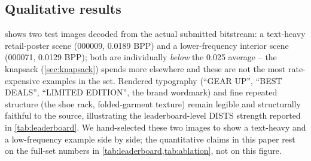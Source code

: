 \documentclass[runningheads]{llncs}
\begin{document}
\begin{table}[t]
\centering\scriptsize
{}
\caption{Official final test-phase leaderboard, organizer-recalculated and announced August 4, 2026, at full precision. Our DISTS (0.038970) is second-lowest overall (only prophet1's 0.038851 is lower) and lowest among every entry ranked above us; our LPIPS is not a leadership position. PSNR trails the top four by 1.6--2.8\,dB (\cref{sec:discussion}).}
\label{tab:leaderboard}
\end{table}

\subsection{Qualitative results}
 shows two test images decoded from the actual submitted bitstream: a text-heavy retail-poster scene (000009, 0.0189 BPP) and a lower-frequency interior scene (000071, 0.0129 BPP); both are individually \emph{below} the 0.025 average -- the knapsack (\cref{sec:knapsack}) spends more elsewhere and these are not the most rate-expensive examples in the set. Rendered typography (``GEAR UP'', ``BEST DEALS'', ``LIMITED EDITION'', the brand wordmark) and fine repeated structure (the shoe rack, folded-garment texture) remain legible and structurally faithful to the source, illustrating the leaderboard-level DISTS strength reported in \cref{tab:leaderboard}. We hand-selected these two images to show a text-heavy and a low-frequency example side by side; the quantitative claims in this paper rest on the full-set numbers in \cref{tab:leaderboard,tab:ablation}, not on this figure.
\end{document}
